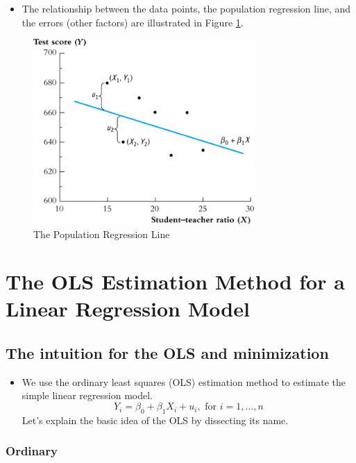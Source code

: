 \documentclass[11pt]{article}
\begin{document}
\begin{itemize}
\item The relationship between the data points, the population regression
line, and the errors (other factors) are illustrated in Figure \ref{fig:org42b3132}.
\end{itemize}

\begin{figure}[htbp]
\centering
\includegraphics[width=0.75\textwidth]{figure/fig-4-1.png}
\caption{\label{fig:org42b3132}
The Population Regression Line}
\end{figure}


\section*{The OLS Estimation Method for a Linear Regression Model}
\label{sec:orgf6758a4}

\subsection*{The intuition for the OLS and minimization}
\label{sec:orgacf89ca}

\begin{itemize}
\item We use the ordinary least squares (OLS) estimation method to estimate
the simple linear regression model. 
$$Y_i = \beta_0 + \beta_1 X_i + u_i, \text{ for } i = 1, \ldots, n$$
Let's explain the basic idea of the OLS by dissecting its name.
\end{itemize}

\subsubsection*{Ordinary}
\label{sec:org333d6d4}
\end{document}
